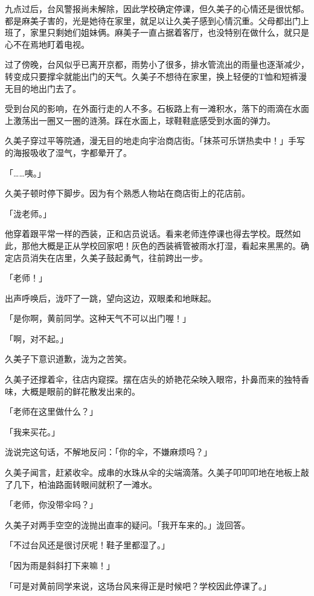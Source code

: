 \documentclass[UTF8]{ctexart}
\begin{document}
    九点过后，台风警报尚未解除，因此学校确定停课，但久美子的心情还是很忧郁。都是麻美子害的，光是她待在家里，就足以让久美子感到心情沉重。父母都出门上班了，家里只剩她们姐妹俩。麻美子一直占据着客厅，也没特别在做什么，就只是心不在焉地盯着电视。 

    过了傍晚，台风似乎已离开京都，雨势小了很多，排水管流出的雨量也逐渐减少，转变成只要撑伞就能出门的天气。久美子不想待在家里，换上轻便的T恤和短裤漫无目的地出门去了。 

    受到台风的影响，在外面行走的人不多。石板路上有一滩积水，落下的雨滴在水面上激荡出一圈又一圈的涟漪。踩在水面上，球鞋鞋底感受到水面的弹力。 

    久美子穿过平等院通，漫无目的地走向宇治商店街。「抹茶可乐饼热卖中！」手写的海报吸收了湿气，字都晕开了。 

    「……咦。」 

    久美子顿时停下脚步。因为有个熟悉人物站在商店街上的花店前。 

    「泷老师。」 

    他穿着跟平常一样的西装，正和店员说话。看来老师连停课也得去学校。既然如此，那他大概是正从学校回家吧！灰色的西装裤管被雨水打湿，看起来黑黑的。确定店员消失在店里，久美子鼓起勇气，往前跨出一步。 

    「老师！」 

    出声呼唤后，泷吓了一跳，望向这边，双眼柔和地眯起。 

    「是你啊，黄前同学。这种天气不可以出门喔！」 

    「啊，对不起。」 

    久美子下意识道歉，泷为之苦笑。 

    久美子还撑着伞，往店内窥探。摆在店头的娇艳花朵映入眼帘，扑鼻而来的独特香味，大概是眼前的鲜花散发出来的。 

    「老师在这里做什么？」 

    「我来买花。」 

    泷说完这句话，不解地反问：「你的伞，不嫌麻烦吗？」 

    久美子闻言，赶紧收伞。成串的水珠从伞的尖端滴落。久美子叩叩叩地在地板上敲了几下，柏油路面转眼间就积了一滩水。 

    「老师，你没带伞吗？」 

    久美子对两手空空的泷抛出直率的疑问。「我开车来的。」泷回答。 

    「不过台风还是很讨厌呢！鞋子里都湿了。」 

    「因为雨是斜斜打下来嘛！」 

    「可是对黄前同学来说，这场台风来得正是时候吧？学校因此停课了。」 
\end{document}
